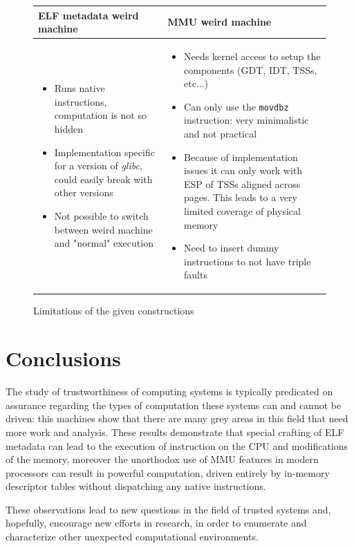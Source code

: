 \documentclass[11pt,twoside,a4paper]{article}
\begin{document}
\begin{figure}[ht!]
\vspace{-0.1cm}
\begin{longtable}{ p{} | p{} }
\bfseries{ELF metadata weird machine} & \bfseries{MMU weird machine} \\ \hline
\begin{itemize}[noitemsep,topsep={0pt},partopsep={0pt}]
\item Runs native instructions, computation is not so hidden
\item Implementation specific for a version of \emph{glibc}, could easily break with other versions
\item Not possible to switch between weird machine and "normal" execution
\vspace{-0.6cm}
\end{itemize}
&
\begin{itemize}[noitemsep,topsep={0pt},partopsep={0pt}]
\item Needs kernel access to setup the components (GDT, IDT, TSSs, etc...)
\item Can only use the \texttt{movdbz} instruction: very minimalistic and not practical
\item Because of implementation issues it can only work with ESP of TSSs aligned across pages. This leads to a very limited coverage of physical memory
\item Need to insert dummy instructions to not have triple faults
\vspace{-0.6cm}
\end{itemize}
\end{longtable}
\caption{Limitations of the given constructions}
\vspace{-0.6cm}
\label{disadvantages}
\end{figure}


\section{Conclusions}

The study of trustworthiness of computing systems is typically predicated on assurance regarding the types of computation these systems can and cannot be driven: this machines show that there are many grey areas in this field that need more work and analysis.
These results demonstrate that special crafting of ELF metadata can lead to the execution of instruction on the CPU and modifications of the memory, moreover the unorthodox use of MMU features in modern processors can result in powerful computation, driven entirely by in-memory descriptor tables without dispatching any native instructions.

These observations lead to new questions in the field of trusted systems and, hopefully, encourage new efforts in research, in order to enumerate and characterize other unexpected computational environments.



\end{document}
